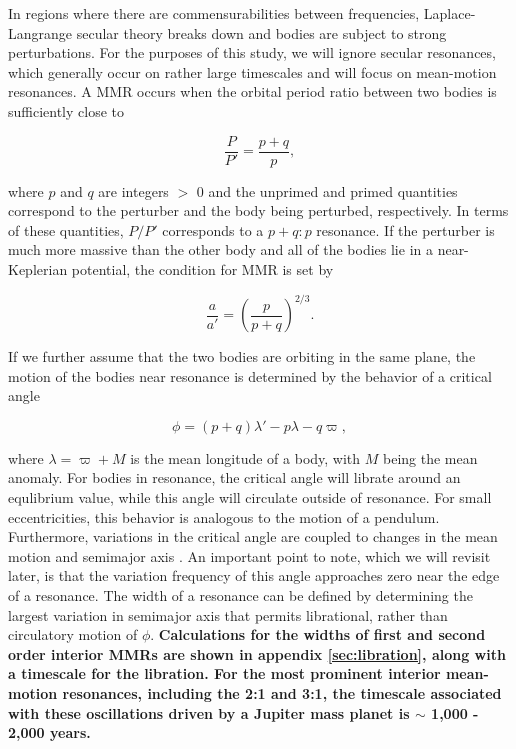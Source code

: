 \documentclass[fleqn,usenatbib]{mnras}
\begin{document}
In regions where there are commensurabilities between frequencies, Laplace-Langrange secular theory breaks down and bodies are subject to strong 
perturbations. For the purposes of this study, we will ignore secular resonances, which generally occur on rather large timescales and will focus on 
mean-motion resonances. A MMR occurs  when the orbital period ratio between two bodies is sufficiently close to

\begin{equation}\label{eq:per_mmr}
	\frac{P}{P'} = \frac{p + q}{p},
\end{equation}

\noindent where  $p$ and $q$ are integers $>$ 0 and the unprimed and primed quantities correspond to the perturber and the body being perturbed, 
respectively. In terms of these quantities, $P/P'$ corresponds to a $p+q:p$ resonance. If the perturber is much more massive than the other body and all of the 
bodies lie in a near-Keplerian potential, the condition for MMR is set by

\begin{equation}\label{eq:a_mmr}
	\frac{a}{a'} = \left( \frac{p}{p + q} \right)^{2/3}.
\end{equation}

If we further assume that the two bodies are orbiting in the same plane, the motion of the bodies near resonance is determined by the
behavior of a critical angle

\begin{equation}\label{eq:phi_crit}
	\phi = (p + q) \lambda' - p \lambda - q \varpi,
\end{equation}

\noindent where $\lambda = \varpi + M$ is the mean longitude of a
body, with $M$ being the mean anomaly. For bodies in resonance, the critical angle will librate around an 
equlibrium value, while this angle will circulate outside of resonance. For small eccentricities, this behavior is analogous to the motion of a 
pendulum. Furthermore, variations in the critical angle are coupled to changes in the mean motion and semimajor axis \citep{1999ssd..book.....M}. An important 
point to note, which we will revisit later, is that the variation frequency of this angle approaches zero near the edge of a resonance. The 
width of a resonance can be defined by determining the largest variation in semimajor axis that permits librational, rather than circulatory motion of $\phi$. 
\textbf{Calculations for the widths of first and second order interior MMRs are shown in appendix \ref{sec:libration}, along with a timescale for the libration. For the most prominent interior 
mean-motion resonances, including the 2:1 and 3:1, the timescale associated with these oscillations driven by a Jupiter mass planet is  $\sim$ 1,000 - 2,000 years.}
\end{document}
